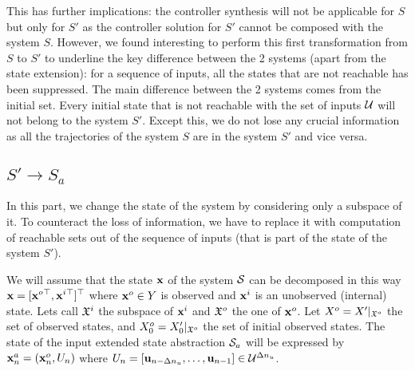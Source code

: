This has further implications: the controller synthesis will not be applicable for $S$ but only for $S'$ as the controller solution for $S'$ cannot be composed with the system $S$.
However, we found interesting to perform this first transformation from $S$ to $S'$ to underline the key difference between the 2 systems (apart from the state extension): for a sequence of inputs, all the states that are not reachable has been suppressed.
The main difference between the 2 systems comes from the initial set. Every initial state that is not reachable with the set of inputs $\mathcal{U}$ will not belong to the system $S'$.
Except this, we do not lose any crucial information as all the trajectories of the system $S$ are in the system $S'$ and vice versa.

\subsection{$S' \rightarrow S_a$}
In this part, we change the state of the system by considering only a subspace of it.
To counteract the loss of information, we have to replace it with computation of reachable sets out of the sequence of inputs (that is part of the state of the system $S'$).

We will assume that the state $ \mathbf{x}$ of the system $\mathcal{S}$ can be decomposed in this way $\displaystyle \mathbf{x} = [ \mathbf{x}^o{}^\top, \mathbf{x}^i{}^\top]{}^\top$ where $ \mathbf{x}^o \in Y$  is observed and $ \mathbf{x}^i$ is an unobserved (internal) state.
Lets call $\mathfrak{X}^i$ the subspace of $ \mathbf{x}^i$ and $\mathfrak{X}^o$ the one of $ \mathbf{x}^o$.
Let $X^o = X' |_{\mathfrak{X}^o}$ the set of observed states, and 
$X^o_0 = X'_0 |_{\mathfrak{X}^o}$ the set of initial observed states.
The state of the input extended state abstraction $\mathcal{S}_a$ will be expressed by $ \mathbf{x}^a_n = ( \mathbf{x}^o_n,U_n)$ where $U_n = [ \mathbf{u}_{n-\Delta n_u},\dots, \mathbf{u}_{n-1}] \in \mathcal{U}^{\Delta n_u}$.

